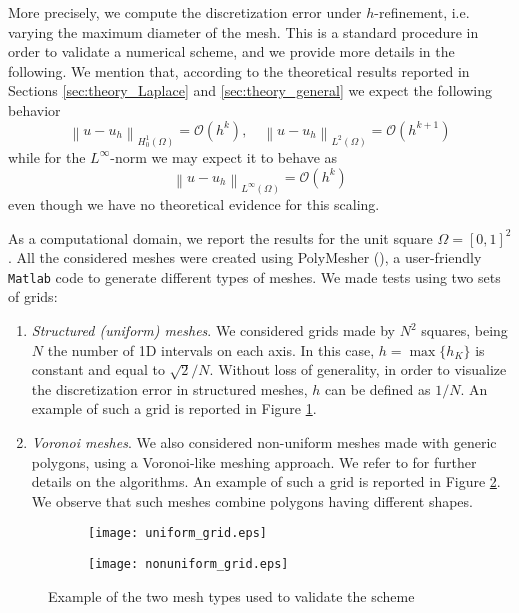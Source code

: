 \documentclass[10pt]{article}
\newcommand{\norm}[2]{\left\lVert#1\right\rVert_{#2}}
\begin{document}
\begin{itemize}
\begin{itemize}
	\end{itemize}
	More precisely, we compute the discretization error under $h$-refinement, i.e. varying the maximum diameter of the mesh. This is a standard procedure in order to validate a numerical scheme, and we provide more details in the following. We mention that, according to the theoretical results reported in Sections \ref{sec:theory_Laplace} and \ref{sec:theory_general} we expect the following behavior
		$$\norm{u-u_h}{H^1_0(\Omega)}=\mathcal{O}(h^k), \quad \norm{u-u_h}{L^2(\Omega)}=\mathcal{O}(h^{k+1})$$
		while for the $L^\infty$-norm we may expect it to behave as $$\norm{u-u_h}{L^\infty(\Omega)}=\mathcal{O}(h^k)$$ even though we have no theoretical evidence for this scaling.
\end{itemize}
As a computational domain, we report the results for the unit square $\Omega=[0,1]^2$. 
All the considered meshes were created using PolyMesher (\cite{polymesher}), a user-friendly \texttt{Matlab} code to generate different types of meshes. We made tests using two sets of grids:
\begin{enumerate}
	\item \textit{Structured (uniform) meshes}. We considered grids made by $N^2$ squares, being $N$ the number of 1D intervals on each axis. In this case, $h=\max \lbrace h_K \rbrace$ is constant and equal to $\sqrt{2}/N$. Without loss of generality, in order to visualize the discretization error in structured meshes, $h$ can be defined as $1/N$. An example of such a grid is reported in Figure \ref{fig:uniform}.
	\item \textit{Voronoi meshes}. We also considered non-uniform meshes made with generic polygons, using a Voronoi-like meshing approach. We refer to \cite{polymesher} for further details on the algorithms. An example of such a grid is reported in Figure \ref{fig:voronoi}. We observe that such meshes combine polygons having different shapes.
\end{enumerate}

\begin{figure}[H]
	\centering
	\begin{subfigure}{0.49\textwidth}
		\centering
		\texttt{[image: uniform\_grid.eps]}
		\label{fig:uniform}
	\end{subfigure}
	\begin{subfigure}{0.49\textwidth}
		\centering
		\texttt{[image: nonuniform\_grid.eps]}
		\label{fig:voronoi}
	\end{subfigure}
	\caption{Example of the two mesh types used to validate the scheme}
	\label{fig:meshes}
\end{figure} 
\end{document}
